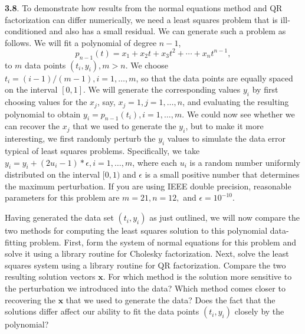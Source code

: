 \textbf{3.8}.
To demonstrate how results from the normal equations method and QR factorization
  can differ numerically,
  we need a least squares problem that is ill-conditioned and also has
  a small residual.
  We can generate such a problem as follows.
  We will fit a polynomial of degree $n-1$,
  \begin{displaymath}
    p_{n-1}(t) = x_1 + x_2t + x_3t^2 + \cdots + x_nt^{n-1},
  \end{displaymath}
  to $m$ data points $(t_i, y_i), m>n$.
  We choose $t_i=(i-1)/(m-1), i=1, \ldots, m$,
  so that the data points are equally spaced on the interval $[0, 1]$.
  We will generate the corresponding values $y_i$ by first choosing values
  for the $x_j$, say, $x_j=1, j=1, \ldots, n$,
  and evaluating the resulting polynomial to obtain $y_i=p_{n-1}(t_i), i=1, \ldots, m$.
  We could now see whether we can recover the $x_j$ that we used to generate the $y_i$,
  but to make it more interesting,
  we first randomly perturb the $y_i$ values to simulate the data error typical of
  least squares problems.
  Specifically, we take $y_i=y_i+(2u_i-1)*\epsilon, i=1, \ldots, m$,
  where each $u_i$ is a random number uniformly distributed on the interval $[0, 1)$
  and $\epsilon$ is a small positive number that determines the maximum perturbation.
  If you are using IEEE double precision,
  reasonable parameters for this problem are
  $m=21, n=12,$ and $\epsilon=10^{-10}$.

  Having generated the data set $(t_i, y_i)$ as just outlined,
  we will now compare the two methods for computing the least squares solution to
  this polynomial data-fitting problem.
  First, form the system of normal equations for this problem and solve
  it using a library routine for Cholesky factorization.
  Next, solve the least squares system using a library routine for QR factorization.
  Compare the two resulting solution vectors $\bm{x}$.
  For which method is the solution more sensitive to the perturbation we introduced into the data?
  Which method comes closer to recovering the $\bm{x}$
  that we used to generate the data?
  Does the fact that the solutions differ affect our ability to fit the data points
  $(t_i, y_i)$ closely by the polynomial?

